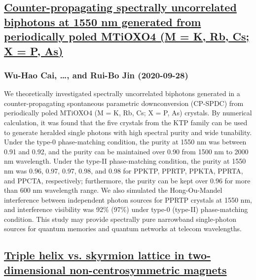 \subsection*{\href{http://arxiv.org/abs/2009.13321v1}{Counter-propagating spectrally uncorrelated biphotons at 1550 nm  generated from periodically poled MTiOXO4 (M = K, Rb, Cs; X = P, As)}}
\subsubsection*{Wu-Hao Cai, \dots, and Rui-Bo Jin (2020-09-28)}
We theoretically investigated spectrally uncorrelated biphotons generated in
a counter-propagating spontaneous parametric downconversion (CP-SPDC) from
periodically poled MTiOXO4 (M = K, Rb, Cs; X = P, As) crystals. By numerical
calculation, it was found that the five crystals from the KTP family can be
used to generate heralded single photons with high spectral purity and wide
tunability. Under the type-0 phase-matching condition, the purity at 1550 nm
was between 0.91 and 0.92, and the purity can be maintained over 0.90 from 1500
nm to 2000 nm wavelength. Under the type-II phase-matching condition, the
purity at 1550 nm was 0.96, 0.97, 0.97, 0.98, and 0.98 for PPKTP, PPRTP, PPKTA,
PPRTA, and PPCTA, respectively; furthermore, the purity can be kept over 0.96
for more than 600 nm wavelength range. We also simulated the Hong-Ou-Mandel
interference between independent photon sources for PPRTP crystals at 1550 nm,
and interference visibility was 92\% (97\%) under type-0 (type-II) phase-matching
condition. This study may provide spectrally pure narrowband single-photon
sources for quantum memories and quantum networks at telecom wavelengths.

\subsection*{\href{http://arxiv.org/abs/2009.13313v1}{Triple helix vs. skyrmion lattice in two-dimensional non-centrosymmetric  magnets}}

